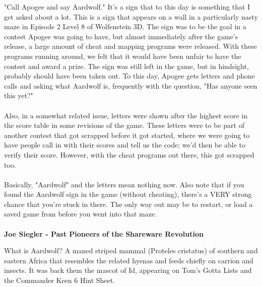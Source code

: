 \par
\begin{fancyquotes}
"Call Apogee and say Aardwolf."  It's a sign that to this day is something
that I get asked about a lot.  This is a sign that appears on a wall in a
particularly nasty maze in Episode 2 Level 8 of Wolfenstein 3D.  The sign
was to be the goal in a contest Apogee was going to have, but almost
immediately after the game's release, a large amount of cheat and mapping
programs were released.  With these programs running around, we felt that
it would have been unfair to have the contest and award a prize.  The sign
was still left in the game, but in hindsight, probably should have been
taken out.  To this day, Apogee gets letters and phone calls and asking
what Aardwolf is, frequently with the question, "Has anyone seen this yet?"\\
\\
Also, in a somewhat related issue, letters were shown after the highest score
in the score table in some revisions of the game.  These letters were to be
part of another contest that got scrapped before it got started, where we were
going to have people call in with their scores and tell us the code; we'd then
be able to verify their score.  However, with the cheat programs out there,
this got scrapped too.\\
\\
Basically, "Aardwolf" and the letters mean nothing now.  Also note that if
you found the Aardwolf sign in the game (without cheating), there's a VERY
strong chance that you're stuck in there.  The only way out may be to restart,
or load a saved game from before you went into that maze.\\
\\
\textbf{Joe Siegler - Past Pioneers of the Shareware Revolution}
\end{fancyquotes}
\par
{} What is Aardwolf? A maned striped mammal (Proteles cristatus) of southern and eastern Africa that resembles the related hyenas and feeds chiefly on carrion and insects. It was back them the mascot of Id, appearing on Tom's Gotta Lists and the Commander Keen 6 Hint Sheet.














 
 
